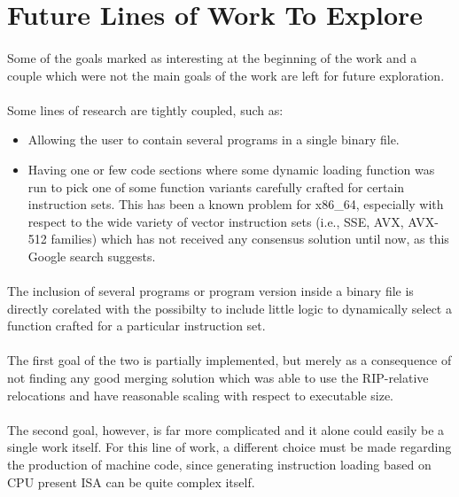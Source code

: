 \documentclass[12pt]{article}
\begin{document}
	\section{Future Lines of Work To Explore}
	\paragraph{}Some of the goals marked as interesting at the beginning of the work and a couple which were not the main goals of the work are left for future exploration.
	
	\paragraph{}Some lines of research are tightly coupled, such as:
	\begin{itemize}
		\item Allowing the user to contain several programs in a single binary file.
		\item Having one or few code sections where some dynamic loading function was run to pick one of some function variants carefully crafted for certain instruction sets. This has been a known problem for x86\_64, especially with respect to the wide variety of vector instruction sets (i.e., \acrshort{SSE}, \acrshort{AVX}, AVX-512 families) which has not received any consensus solution until now, as this Google search suggests\cite{cpu-dispatch}.
	\end{itemize}
	\paragraph{}The inclusion of several programs or program version inside a binary file is directly corelated with the possibilty to include little logic to dynamically select a function crafted for a particular instruction set.
	\paragraph{}The first goal of the two is partially implemented, but merely as a consequence of not finding any good merging solution which was able to use the \gls{RIP}-relative relocations and have reasonable scaling with respect to executable size.
	\paragraph{}The second goal, however, is far more complicated and it alone could easily be a single work itself. For this line of work, a different choice must be made regarding the production of machine code, since generating instruction loading based on CPU present \acrshort{ISA} can be quite complex itself.
	
\end{document}
